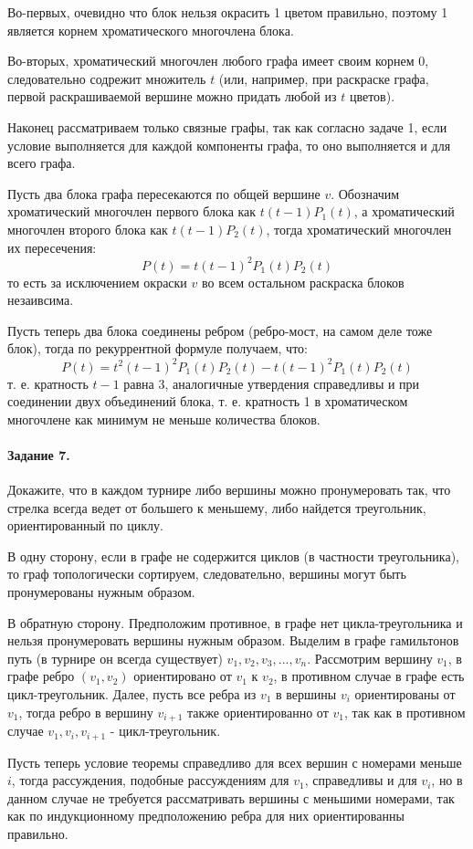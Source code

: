 \documentclass[a4paper,12pt]{article}
\begin{document}
\begin{Solution}
Во-первых, очевидно что блок нельзя окрасить 1 цветом правильно, поэтому 1 является корнем хроматического многочлена блока.

Во-вторых, хроматический многочлен любого графа имеет своим корнем 0, следовательно содрежит множитель $t$ (или, например, при раскраске графа, первой раскрашиваемой вершине можно придать любой из $t$ цветов).

Наконец рассматриваем только связные графы, так как согласно задаче 1, если условие выполняется для каждой компоненты графа, то оно выполняется и для всего графа.

Пусть два блока графа пересекаются по общей вершине $v$. Обозначим хроматический многочлен первого блока как $t \left(t-1\right) P_1\left(t\right)$, а хроматический многочлен второго блока как $t \left(t-1\right) P_2\left(t\right)$, тогда хроматический многочлен их пересечения:
\[
	P\left(t\right) = t \left(t-1\right)^2 P_1\left(t\right) P_2\left(t\right)
\]
то есть за исключением окраски $v$ во всем остальном раскраска блоков незаивсима.

Пусть теперь два блока соединены ребром (ребро-мост, на самом деле тоже блок), тогда по рекуррентной формуле получаем, что:
\[
	P\left(t\right) = t^2\left(t-1\right)^2P_1\left(t\right) P_2\left(t\right) - t \left(t-1\right)^2 P_1\left(t\right) P_2\left(t\right)
\]
т. е. кратность $t-1$ равна 3, аналогичные утвердения справедливы и при соединении двух объединений блока, т. е. кратность 1 в хроматическом многочлене как минимум не меньше количества блоков.
\end{Solution}

\paragraph{Задание 7.} Докажите, что в каждом турнире либо вершины можно пронумеровать так, что стрелка всегда ведет от большего к меньшему, либо найдется треугольник, ориентированный по циклу.

\begin{Solution}
В одну сторону, если в графе не содержится циклов (в частности треугольника), то граф топологически сортируем, следовательно, вершины могут быть пронумерованы нужным образом.

В обратную сторону. Предположим противное, в графе нет цикла-треугольника и нельзя пронумеровать вершины нужным образом. Выделим в графе гамильтонов путь (в турнире он всегда существует) $v_1, v_2, v_3, ..., v_n$. Рассмотрим вершину $v_1$, в графе ребро $(v_1,v_2)$ ориентировано от $v_1$ к $v_2$, в противном случае в графе есть цикл-треугольник. Далее, пусть все ребра из $v_1$ в вершины $v_i$ ориентированы от $v_1$, тогда ребро в вершину $v_{i+1}$ также ориентированно от $v_1$, так как в противном случае $v_1, v_i, v_{i+1}$ - цикл-треугольник.

Пусть теперь условие теоремы справедливо для всех вершин с номерами меньше $i$, тогда рассуждения, подобные рассуждениям для $v_1$, справедливы и для $v_i$, но в данном случае не требуется рассматривать вершины с меньшими номерами, так как по индукционному предположению ребра для них ориентированны правильно.
\end{Solution}
\end{document}
